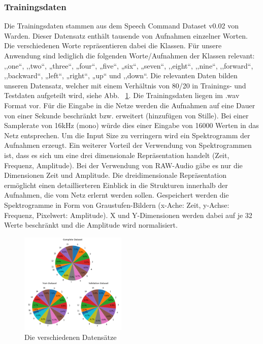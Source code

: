 \documentclass[sigconf]{acmart}
\begin{document}
\subsubsection{Trainingsdaten\\}
Die Trainingsdaten stammen aus dem Speech Command Dataset v0.02 von Warden\cite{speechcommandsv2}. Dieser Datensatz enthält tausende von Aufnahmen einzelner Worten. Die verschiedenen Worte repräsentieren dabei die Klassen. Für unsere Anwendung sind lediglich die folgenden Worte/Aufnahmen der Klassen relevant: 
\newline
\newline
,,one“, ,,two“, „three“, „four“, „five“, „six“, „seven“, ,,eight“, ,,nine“, ,,forward“, ,,backward“, „left“, „right“, „up“ und ,,down“. 
\newline
\newline
Die relevanten Daten bilden unseren Datensatz, welcher mit einem Verhältnis von 80/20 in Trainings- und Testdaten aufgeteilt wird, siehe Abb. ~\ref{fig:TrainingsDaten}.
\newline
\newline
Die Trainingsdaten liegen im .wav Format vor. Für die Eingabe in die Netze werden die Aufnahmen auf eine Dauer von einer Sekunde beschränkt bzw. erweitert (hinzufügen von Stille). Bei einer Samplerate von 16kHz (mono) würde dies einer Eingabe von 16000 Werten in das Netz entsprechen. Um die Input Size zu verringern wird ein Spektrogramm der Aufnahmen erzeugt.  
Ein weiterer Vorteil der Verwendung von Spektrogrammen ist, dass es sich um eine drei dimensionale Repräsentation handelt (Zeit, Frequenz, Amplitude). Bei der Verwendung von RAW-Audio gäbe es nur die Dimensionen Zeit und Amplitude. Die dreidimensionale Repräsentation ermöglicht einen detaillierteren Einblick in die Strukturen innerhalb der Aufnahmen, die vom Netz erlernt werden sollen. Gespeichert werden die Spektrogramme in Form von Graustufen-Bildern (x-Ache: Zeit, y-Achse: Frequenz, Pixelwert: Amplitude). X und Y-Dimensionen werden dabei auf je 32 Werte beschränkt und die Amplitude wird normalisiert. 
\begin{figure}[ht]
  \includegraphics[width=0.45\textwidth]{images/DataBalance}
  \caption{Die verschiedenen Datensätze}
  \Description{}
  \label{fig:TrainingsDaten}
\end{figure}
\end{document}
